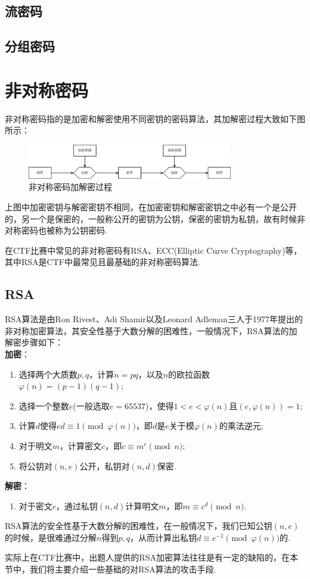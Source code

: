 \documentclass{book}
\numberwithin{equation}{subsubsection}
\begin{document}
\section{流密码}
\section{分组密码}

\newpage
\chapter{非对称密码}
非对称密码指的是加密和解密使用不同密钥的密码算法，其加解密过程大致如下图所示：\par
\begin{figure}[h]
    \centering
    \includegraphics[width=0.8\textwidth]{Picture/Asymmetric.png}
    \caption{非对称密码加解密过程}
\end{figure}\par
上图中加密密钥与解密密钥不相同，在加密密钥和解密密钥之中必有一个是公开的，另一个是保密的，一般称公开的密钥为公钥，保密的密钥为私钥，故有时候非对称密码也被称为公钥密码.\par
在CTF比赛中常见的非对称密码有RSA、ECC(Elliptic Curve Cryptography)等，其中RSA是CTF中最常见且最基础的非对称密码算法.
\section{RSA}
RSA算法是由Ron Rivest、Adi Shamir以及Leonard Adleman三人于1977年提出的非对称加密算法，其安全性基于大数分解的困难性，一般情况下，RSA算法的加解密步骤如下：\\
\textbf{加密}：\par
\begin{enumerate}
    \item 选择两个大质数$p,q$，计算$n=pq$，以及$n$的欧拉函数$\varphi(n)=(p-1)(q-1)$;
    \item 选择一个整数$e$(一般选取$e=65537$)，使得$1<e<\varphi(n)$且$(e,\varphi(n))=1$;
    \item 计算$d$使得$ed\equiv 1\pmod{\varphi(n)}$，即$d$是$e$关于模$\varphi(n)$的乘法逆元;
    \item 对于明文$m$，计算密文$c$，即$c\equiv m^e\pmod{n}$;
    \item 将公钥对$(n,e)$公开，私钥对$(n,d)$保密.
\end{enumerate}
\textbf{解密}：\par
\begin{enumerate}
    \item 对于密文$c$，通过私钥$(n,d)$计算明文$m$，即$m\equiv c^d\pmod{n}$.
\end{enumerate}
RSA算法的安全性基于大数分解的困难性，在一般情况下，我们已知公钥$(n,e)$的时候，是很难通过分解$n$得到$p,q$，从而计算出私钥$d\equiv e^{-1}\pmod{\varphi(n)}$的.\par
实际上在CTF比赛中，出题人提供的RSA加密算法往往是有一定的缺陷的，在本节中，我们将主要介绍一些基础的对RSA算法的攻击手段.
\end{document}
